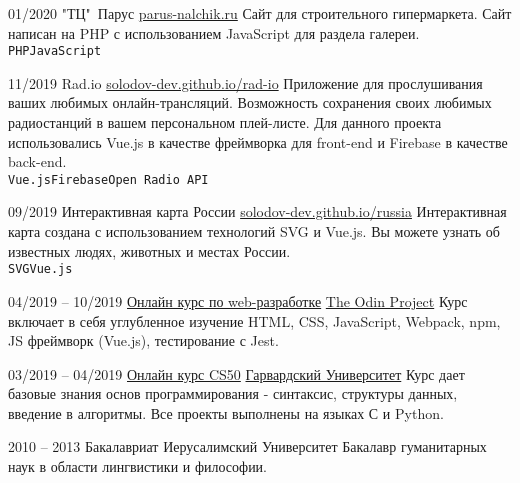 \documentclass[9pt]{developercv} %
\begin{document}
\begin{entrylist}
   \entry
    {01/2020}
    {"ТЦ"\ Парус}
    {\href{https://parus-nalchik.ru}{parus-nalchik.ru}}
    {Сайт для строительного гипермаркета. Сайт написан на PHP с использованием JavaScript для раздела галереи.
\\ \texttt{PHP}\slashsep\texttt{JavaScript}}

 \entry
    {11/2019}
    {Rad.io}
    {\href{https://solodov-dev.github.io/rad-io}{solodov-dev.github.io/rad-io}}
    {Приложение для прослушивания ваших любимых онлайн-трансляций. Возможность сохранения своих любимых радиостанций в
вашем персональном плей-листе. Для данного проекта использовались Vue.js в качестве фреймворка для front-end и Firebase в качестве back-end.
\\ \texttt{Vue.js}\slashsep\texttt{Firebase}\slashsep\texttt{Open Radio API}}

 \entry
    {09/2019}
    {Интерактивная карта России}
    {\href{https://solodov-dev.github.io/russia}{solodov-dev.github.io/russia}}
    {Интерактивная карта создана с использованием технологий SVG и Vue.js. Вы можете узнать об известных людях, животных и местах России.\\ \texttt{SVG}\slashsep\texttt{Vue.js}}
\end{entrylist}


\begin{entrylist}
  \entry
      {04/2019 -- 10/2019}
      {\href{https://www.theodinproject.com}{Онлайн курс по web-разработке}}
      {\href{https://www.theodinproject.com}{The Odin Project}}
      {Курс включает в себя углубленное изучение HTML, CSS, JavaScript, Webpack, npm, JS фреймворк (Vue.js), тестирование с Jest.}

  \entry
      {03/2019 -- 04/2019}
      {\href{https://www.edx.org/course/cs50s-introduction-to-computer-science}{Онлайн курс CS50}}
      {\href{https://www.edx.org/course/cs50s-introduction-to-computer-science}{Гарвардский Университет}}
      {Курс дает базовые знания основ программирования - синтаксис, структуры данных, введение в алгоритмы. Все проекты выполнены на языках С и Python.}

  \entry
      {2010 -- 2013}
      {Бакалавриат}
      {Иерусалимский Университет}
      {Бакалавр гуманитарных наук в области лингвистики и философии.}
\end{entrylist}
\end{document}
